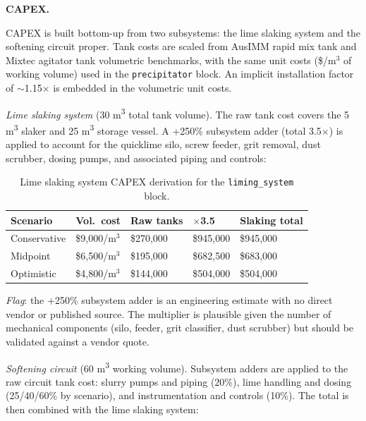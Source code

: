 \medskip
\noindent\textbf{CAPEX.}\quad

CAPEX is built bottom-up from two subsystems: the lime slaking system and the softening circuit proper. Tank costs are scaled from AusIMM rapid mix tank and Mixtec agitator tank volumetric benchmarks, with the same unit costs (\$/m$^3$ of working volume) used in the \texttt{precipitator} block. An implicit installation factor of $\sim$1.15$\times$ is embedded in the volumetric unit costs.

\textit{Lime slaking system} (30 \si{m^3} total tank volume). The raw tank cost covers the 5 \si{m^3} slaker and 25 \si{m^3} storage vessel. A +250\% subsystem adder (total 3.5$\times$) is applied to account for the quicklime silo, screw feeder, grit removal, dust scrubber, dosing pumps, and associated piping and controls:

\begin{table}[h!]
\caption{Lime slaking system CAPEX derivation for the \texttt{liming\_system} block.}
\centering
\begin{tabular}{>{\raggedright\arraybackslash}p{2.5cm}
				>{\raggedright\arraybackslash}p{2.8cm}
				>{\raggedright\arraybackslash}p{2.5cm}
				>{\raggedright\arraybackslash}p{2cm}
				>{\raggedright\arraybackslash}p{3cm}}
\toprule
\textbf{Scenario} & \textbf{Vol.\ cost} & \textbf{Raw tanks} & \textbf{$\times$3.5} & \textbf{Slaking total} \\
\midrule
Conservative & \$9,000/m$^3$ & \$270,000 & \$945,000 & \$945,000 \\
Midpoint     & \$6,500/m$^3$ & \$195,000 & \$682,500 & \$683,000 \\
Optimistic   & \$4,800/m$^3$ & \$144,000 & \$504,000 & \$504,000 \\
\bottomrule
\end{tabular}
\end{table}

\noindent\textit{Flag}: the +250\% subsystem adder is an engineering estimate with no direct vendor or published source. The multiplier is plausible given the number of mechanical components (silo, feeder, grit classifier, dust scrubber) but should be validated against a vendor quote.

\textit{Softening circuit} (60 \si{m^3} working volume). Subsystem adders are applied to the raw circuit tank cost: slurry pumps and piping (20\%), lime handling and dosing (25/40/60\% by scenario), and instrumentation and controls (10\%). The total is then combined with the lime slaking system:

